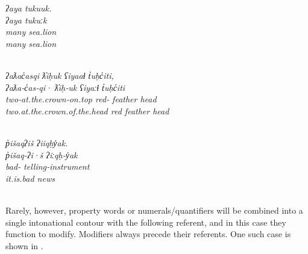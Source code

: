 \begin{exe}
  \ex\label{ex:3.15}
  \begin{xlist}

    \ex\label{ex:3.15a}
    \glllll \em{ʔaya}      tukuuk.\\
            \em{ʔaya}      tukuːk\\
            \em{many}      sea.lion\\
            \em{many}      sea.lion\\
            \em{} \\

    \ex\label{ex:3.15b}
    \glllll \em{ʔaƛac̓asqi}                    \em{ƛ̓iḥuk}       ʕiyaaɬ   t̓uḥc̓iti,\\
            \em{ʔaƛa‑c̓as‑qi·}                  \em{ƛ̓iḥ‑uk}      ʕiyaːɬ   t̓uḥc̓iti\\
            \em{two‑at.the.crown‑on.top}       \em{red‑} feather  head\\
            \em{two.at.the.crown.of.the.head} \em{red}          feather  head\\
            \em{}                    \em{}     \\

    \ex\label{ex:3.15c}
    \glllll \em{p̓išaqʔiš}       ʔiiqḥy̓ak.\\
            \em{p̓išaq‑ʔi·š}     ʔiːqḥ‑y̓ak\\
            \em{bad‑} telling‑instrument\\
            \em{it.is.bad}      news\\
                       \\

  \end{xlist}
\end{exe}

\noindent Rarely, however, property words or numerals/quantifiers will be combined into a single intonational contour with the following referent, and in this case they function to modify. Modifiers always precede their referents. One such case is shown in .

